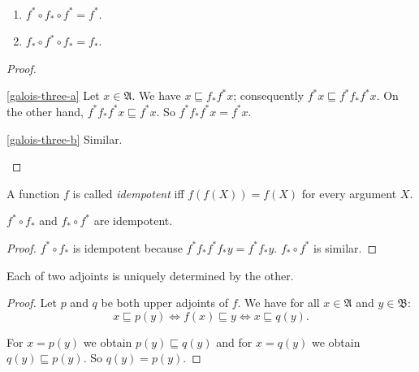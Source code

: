 \begin{thm}
~
\begin{enumerate}
\item \label{galois-three-a}$f^{\ast}\circ f_{\ast}\circ f^{\ast}=f^{\ast}$.
\item \label{galois-three-b}$f_{\ast}\circ f^{\ast}\circ f_{\ast}=f_{\ast}$.
\end{enumerate}
\end{thm}
\begin{proof}
~
\begin{disorder}
\item [{\ref{galois-three-a}}] Let $x\in\mathfrak{A}$. We have $x\sqsubseteq f_{\ast}f^{\ast}x$;
consequently $f^{\ast}x\sqsubseteq f^{\ast}f_{\ast}f^{\ast}x$. On
the other hand, $f^{\ast}f_{\ast}f^{\ast}x\sqsubseteq f^{\ast}x$.
So $f^{\ast}f_{\ast}f^{\ast}x=f^{\ast}x$.
\item [{\ref{galois-three-b}}] Similar.
\end{disorder}
\end{proof}
\begin{defn}
A function $f$ is called \emph{idempotent} iff $f(f(X))=f(X)$
for every argument $X$.\end{defn}
\begin{prop}
$f^{\ast}\circ f_{\ast}$ and $f_{\ast}\circ f^{\ast}$ are idempotent.\end{prop}
\begin{proof}
$f^{\ast}\circ f_{\ast}$ is idempotent because $f^{\ast}f_{\ast}f^{\ast}f_{\ast}y=f^{\ast}f_{\ast}y$.
$f_{\ast}\circ f^{\ast}$ is similar.\end{proof}
\begin{thm}
\label{adj-by-other}Each of two adjoints is uniquely determined by
the other.\end{thm}
\begin{proof}
Let $p$ and $q$ be both upper adjoints of $f$. We have for all
$x\in\mathfrak{A}$ and $y\in\mathfrak{B}$:
\[
x\sqsubseteq p(y)\Leftrightarrow f(x)\sqsubseteq y\Leftrightarrow x\sqsubseteq q(y).
\]


For $x=p(y)$ we obtain $p(y)\sqsubseteq q(y)$ and for $x=q(y)$
we obtain $q(y)\sqsubseteq p(y)$. So $q(y)=p(y)$.\end{proof}

